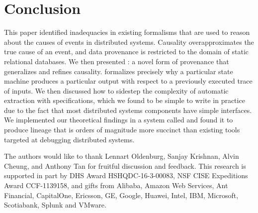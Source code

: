 \section{Conclusion}
This paper identified inadequacies in existing formalisms that are used to
reason about the causes of events in distributed systems. Causality
overapproximates the true cause of an event, and data provenance is restricted
to the domain of static relational databases.  We then presented
\watprovenance{}: a novel form of provenance that generalizes \whyprovenance{}
and refines causality. \Watprovenance{} formalizes precisely why a particular
state machine produces a particular output with respect to a previously
executed trace of inputs. We then discussed how to sidestep the complexity of
automatic \watprovenance{} extraction with \watprovenance{} specifications,
which we found to be simple to write in practice due to the fact that most
distributed systems components have simple interfaces. We implemented our
theoretical findings in a system called \fluent{} and found it to produce
lineage that is orders of magnitude more succinct than existing tools targeted
at debugging distributed systems.

\begin{acks}
  The authors would like to thank Lennart Oldenburg, Sanjay Krishnan, Alvin
  Cheung, and Anthony Tan for fruitful discussion and feedback.
  This research is supported in part by DHS Award HSHQDC-16-3-00083, NSF CISE
  Expeditions Award CCF-1139158, and gifts from Alibaba, Amazon Web Services, Ant
  Financial, CapitalOne, Ericsson, GE, Google, Huawei, Intel, IBM, Microsoft,
  Scotiabank, Splunk and VMware.
\end{acks}
